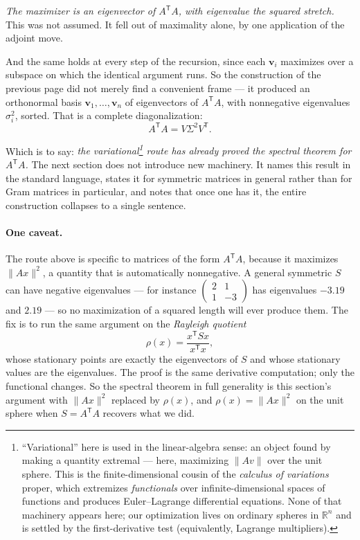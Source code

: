 \documentclass[11pt]{article}
\numberwithin{equation}{section}
\newcommand{\R}{\mathbb{R}}
\newcommand{\T}{^{\mathsf{T}}}
\newcommand{\vv}[1]{\mathbf{v}_{#1}}
\theoremstyle{plainish}
\begin{document}
\emph{The maximizer is an eigenvector of $A\T A$, with eigenvalue the squared
stretch.} This was not assumed. It fell out of maximality alone, by one
application of the adjoint move.

And the same holds at every step of the recursion, since each $\vv i$ maximizes
over a subspace on which the identical argument runs. So the construction of the
previous page did not merely find a convenient frame --- it produced an
orthonormal basis $\vv1, \dots, \vv n$ of eigenvectors of $A\T A$, with
nonnegative eigenvalues $\sigma_i^2$, sorted. That is a complete
diagonalization:
\begin{equation}A\T A = V \Sigma^2 V\T .
\end{equation}

\noindent
Which is to say: \emph{the variational\footnote{``Variational'' here is used in
the linear-algebra sense: an object found by making a quantity extremal ---
here, maximizing $\|Av\|$ over the unit sphere. This is the finite-dimensional
cousin of the \emph{calculus of variations} proper, which extremizes
\emph{functionals} over infinite-dimensional spaces of functions and produces
Euler--Lagrange differential equations. None of that machinery appears here; our
optimization lives on ordinary spheres in $\R^n$ and is settled by the
first-derivative test (equivalently, Lagrange multipliers).} route has already
proved the spectral theorem for $A\T A$.} The next section does not introduce new
machinery. It names this result in the standard language, states it for symmetric
matrices in general rather than for Gram matrices in particular, and notes that
once one has it, the entire construction collapses to a single sentence.

\paragraph{One caveat.} The route above is specific to matrices of the form
$A\T A$, because it maximizes $\|Ax\|^2$, a quantity that is automatically
nonnegative. A general symmetric $S$ can have negative eigenvalues --- for
instance $\left(\begin{smallmatrix} 2 & 1 \\ 1 & -3\end{smallmatrix}\right)$ has
eigenvalues $-3.19$ and $2.19$ --- so no maximization of a squared length will
ever produce them. The fix is to run the same argument on the \emph{Rayleigh
quotient}
\begin{equation}\rho(x) = \frac{x\T S x}{x\T x},
\end{equation}
whose stationary points are exactly the eigenvectors of $S$ and whose stationary
values are the eigenvalues. The proof is the same derivative computation; only
the functional changes. So the spectral theorem in full generality is this
section's argument with $\|Ax\|^2$ replaced by $\rho(x)$, and
$\rho(x) = \|Ax\|^2$ on the unit sphere when $S = A\T A$ recovers what we did.
\end{document}
